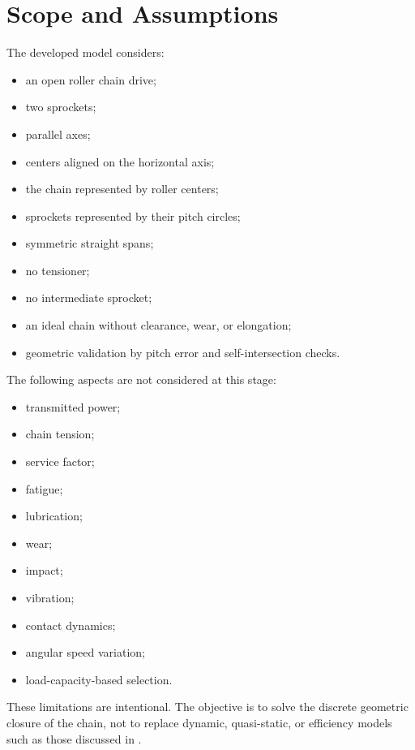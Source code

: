 \documentclass[12pt,a4paper]{article}
\begin{document}
\section{Scope and Assumptions}

The developed model considers:

\begin{itemize}
    \item an open roller chain drive;
    \item two sprockets;
    \item parallel axes;
    \item centers aligned on the horizontal axis;
    \item the chain represented by roller centers;
    \item sprockets represented by their pitch circles;
    \item symmetric straight spans;
    \item no tensioner;
    \item no intermediate sprocket;
    \item an ideal chain without clearance, wear, or elongation;
    \item geometric validation by pitch error and self-intersection checks.
\end{itemize}

The following aspects are not considered at this stage:

\begin{itemize}
    \item transmitted power;
    \item chain tension;
    \item service factor;
    \item fatigue;
    \item lubrication;
    \item wear;
    \item impact;
    \item vibration;
    \item contact dynamics;
    \item angular speed variation;
    \item load-capacity-based selection.
\end{itemize}

These limitations are intentional. The objective is to solve the discrete geometric closure of the chain, not to replace dynamic, quasi-static, or efficiency models such as those discussed in \cite{kim2017,fuglede2016jsv,lanaspeze2024}.
\end{document}
